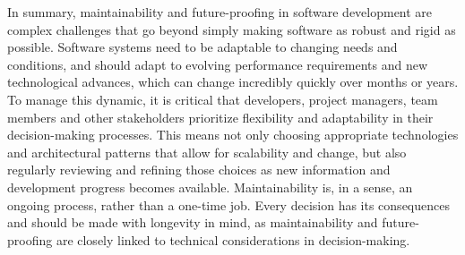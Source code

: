 \newline \noindent In summary, maintainability and future-proofing in software development are complex challenges that go beyond simply making software as robust and rigid as possible. Software systems need to be adaptable to changing needs and conditions, and should adapt to evolving performance requirements and new technological advances, which can change incredibly quickly over months or years. To manage this dynamic, it is critical that developers, project managers, team members and other stakeholders prioritize flexibility and adaptability in their decision-making processes. This means not only choosing appropriate technologies and architectural patterns that allow for scalability and change, but also regularly reviewing and refining those choices as new information and development progress becomes available. Maintainability is, in a sense, an ongoing process, rather than a one-time job. Every decision has its consequences and should be made with longevity in mind, as maintainability and future-proofing are closely linked to technical considerations in decision-making. \cite{6606742}


